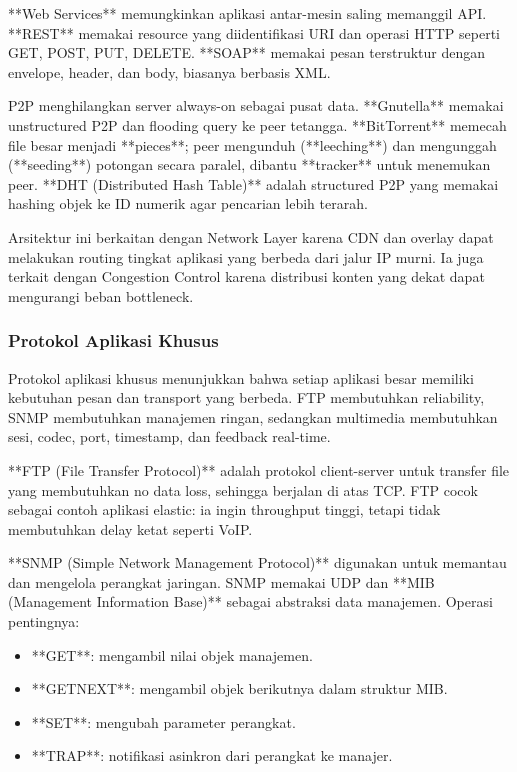 **Web Services** memungkinkan aplikasi antar-mesin saling memanggil API. **REST** memakai resource yang diidentifikasi URI dan operasi HTTP seperti GET, POST, PUT, DELETE. **SOAP** memakai pesan terstruktur dengan envelope, header, dan body, biasanya berbasis XML.

P2P menghilangkan server always-on sebagai pusat data. **Gnutella** memakai unstructured P2P dan flooding query ke peer tetangga. **BitTorrent** memecah file besar menjadi **pieces**; peer mengunduh (**leeching**) dan mengunggah (**seeding**) potongan secara paralel, dibantu **tracker** untuk menemukan peer. **DHT (Distributed Hash Table)** adalah structured P2P yang memakai hashing objek ke ID numerik agar pencarian lebih terarah.

Arsitektur ini berkaitan dengan Network Layer karena CDN dan overlay dapat melakukan routing tingkat aplikasi yang berbeda dari jalur IP murni. Ia juga terkait dengan Congestion Control karena distribusi konten yang dekat dapat mengurangi beban bottleneck.

\subsubsection{Protokol Aplikasi Khusus}
\begin{jawab}
Protokol aplikasi khusus menunjukkan bahwa setiap aplikasi besar memiliki kebutuhan pesan dan transport yang berbeda. FTP membutuhkan reliability, SNMP membutuhkan manajemen ringan, sedangkan multimedia membutuhkan sesi, codec, port, timestamp, dan feedback real-time.
\end{jawab}

**FTP (File Transfer Protocol)** adalah protokol client-server untuk transfer file yang membutuhkan no data loss, sehingga berjalan di atas TCP. FTP cocok sebagai contoh aplikasi elastic: ia ingin throughput tinggi, tetapi tidak membutuhkan delay ketat seperti VoIP.

**SNMP (Simple Network Management Protocol)** digunakan untuk memantau dan mengelola perangkat jaringan. SNMP memakai UDP dan **MIB (Management Information Base)** sebagai abstraksi data manajemen. Operasi pentingnya:
\begin{itemize}
    \item **GET**: mengambil nilai objek manajemen.
    \item **GETNEXT**: mengambil objek berikutnya dalam struktur MIB.
    \item **SET**: mengubah parameter perangkat.
    \item **TRAP**: notifikasi asinkron dari perangkat ke manajer.
\end{itemize}

